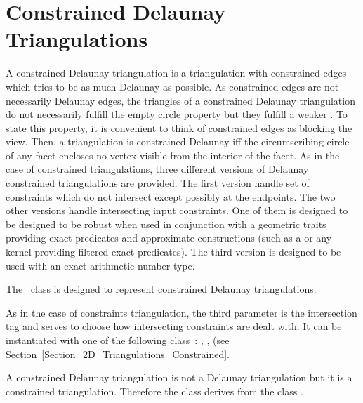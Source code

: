 \section{Constrained Delaunay Triangulations\label{Section_2D_Triangulations_Constrained_Delaunay}}

A constrained Delaunay triangulation is a triangulation with
constrained edges which tries to be as much Delaunay as possible.
As constrained edges are not necessarily Delaunay edges,
the triangles of a constrained Delaunay triangulation do not
necessarily fulfill the empty circle property
but they fulfill a weaker .
 To state this property,
it is convenient to think of  constrained
edges as blocking the view. Then, a triangulation is 
constrained Delaunay iff
 the circumscribing circle
of any facet encloses 
no vertex  visible
from the interior of the facet.
As in the case of constrained triangulations, three different versions
of Delaunay constrained triangulations are provided. The first version
handle set of constraints which do not intersect except possibly
at the endpoints. The two other versions 
handle intersecting input constraints. One of them
 is designed to be designed to be robust
when used in conjunction with a geometric traits
providing exact predicates and approximate constructions
(such as a  or any kernel providing
filtered exact predicates). The third version is designed to be used
with an exact arithmetic number type.




The \cgal\ class
is designed to represent
constrained Delaunay triangulations.

As in the case of constraints triangulation, the third parameter 
 is the intersection tag
and serves to choose how intersecting constraints
are dealt with. It can be instantiated with one of the following
class~: ,
,
(see Section~\ref{Section_2D_Triangulations_Constrained}.

A constrained Delaunay triangulation is not a Delaunay
triangulation but it is a constrained triangulation.
Therefore the class
derives from
the class .

